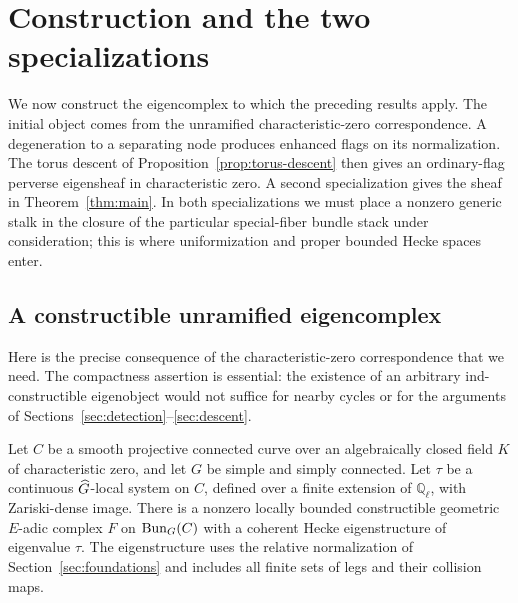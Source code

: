 \section{Construction and the two specializations}\label{sec:construction}

We now construct the eigencomplex to which the preceding results apply.
The initial object comes from the unramified characteristic-zero
correspondence.  A degeneration to a separating node produces enhanced
flags on its normalization.  The torus descent of
Proposition~\ref{prop:torus-descent} then gives an ordinary-flag perverse
eigensheaf in characteristic zero.  A second specialization gives the
sheaf in Theorem~\ref{thm:main}.  In both specializations we must place a
nonzero generic stalk in the closure of the particular special-fiber
bundle stack under consideration; this is where uniformization and
proper bounded Hecke spaces enter.

\subsection{A constructible unramified eigencomplex}

Here is the precise consequence of the characteristic-zero correspondence
that we need.  The compactness assertion is essential: the existence of
an arbitrary ind-constructible eigenobject would not suffice for nearby
cycles or for the arguments of Sections~\ref{sec:detection}--\ref{sec:descent}.

\begin{lemma}\label{lem:compact-eigencomplex}
Let $C$ be a smooth projective connected curve over an algebraically
closed field $K$ of characteristic zero, and let $G$ be simple and simply
connected.  Let $\tau$ be a continuous $\widehat G$-local system on $C$, defined
over a finite extension of $\mathbb Q_\ell$, with Zariski-dense image.
There is a nonzero locally bounded constructible geometric $E$-adic
complex $F$ on $\operatorname{Bun}_G(C)$ with a coherent Hecke eigenstructure of
eigenvalue $\tau$.  The eigenstructure uses the relative normalization of
Section~\ref{sec:foundations} and includes all finite sets of legs and
their collision maps.
\end{lemma}

